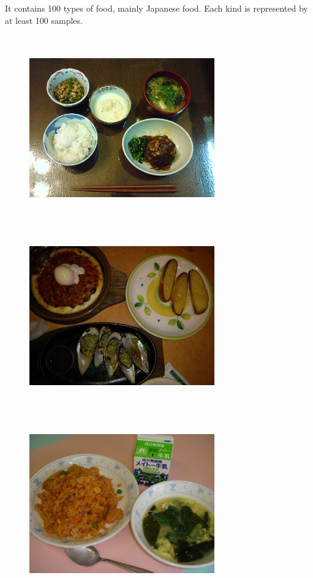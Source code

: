 It contains 100 types of food, mainly Japanese food. Each kind is represented by at least 100 samples.

\begin{figure}[h]
    \includegraphics[width=8cm, height=8cm]{img/multiple_food_items_1}
    \includegraphics[width=8cm, height=8cm]{img/multiple_food_items_2}
    \includegraphics[width=8cm, height=8cm]{img/multiple_food_items_3}

\end{figure}
